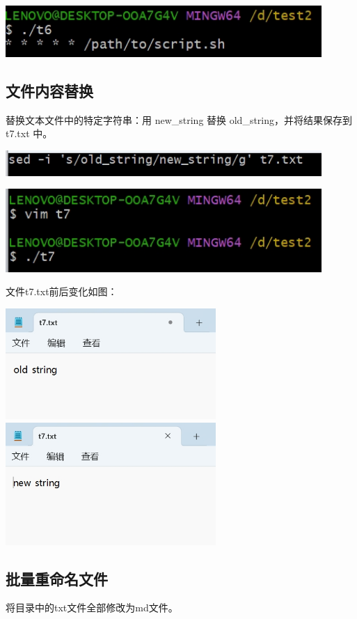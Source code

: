 \documentclass[UTF8,a4paper]{ctexart}
\begin{document}
\begin{sloppypar}
	\includegraphics[width = 12cm]{31}
	
	\subsection{文件内容替换}
	替换文本文件中的特定字符串：用 new\_string 替换 old\_string，并将结果保存到 t7.txt 中。
	
	\includegraphics[width = 12cm]{32}
	
	\includegraphics[width = 12cm]{33}
	
	文件t7.txt前后变化如图：
	
	\includegraphics[width = 8cm]{34}
	\includegraphics[width = 8cm]{35}
	
	\subsection{批量重命名文件}
	将目录中的txt文件全部修改为md文件。
	

\end{sloppypar}
\end{document}
